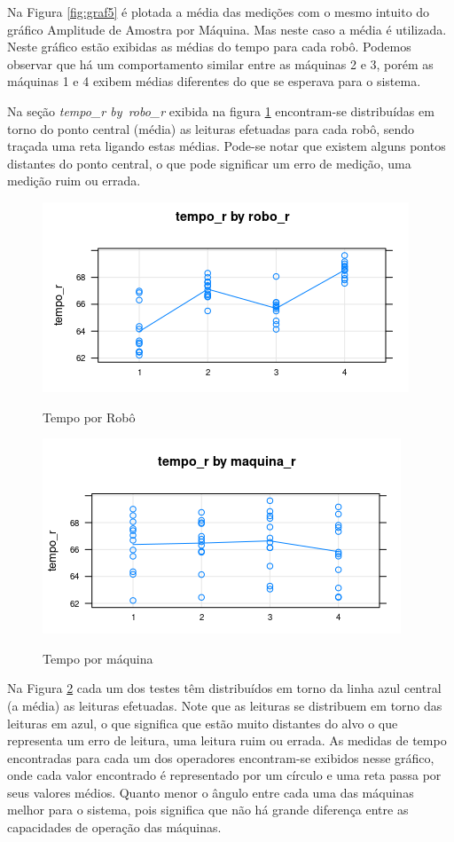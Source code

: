 \documentclass[
12pt,					%
openright,				%
oneside,				%
a4paper,				%
english,
brazil
]{ABNT/abntex2_report}
\begin{document}
Na Figura \ref{fig:graf5} é plotada a média das medições com o mesmo intuito do gráfico Amplitude de Amostra por Máquina. Mas neste caso a média é utilizada. Neste gráfico estão exibidas as médias do tempo para cada robô. Podemos observar que há um comportamento similar entre as máquinas 2 e 3, porém as máquinas 1 e 4 exibem médias diferentes do que se esperava para o
sistema.

Na seção \textit{tempo\_r by\ robo\_r} exibida na figura \ref{fig:tempo_robo} encontram-se distribuídas em torno do ponto central (média) as leituras efetuadas para cada robô, sendo traçada uma reta ligando estas médias. Pode-se notar que existem alguns pontos distantes do ponto central, o que pode significar um erro de medição, uma medição ruim ou errada.
\begin{figure}[H]
	\caption{Tempo por Robô}
	\includegraphics[]{figures/graf2.png}
	\label{fig:tempo_robo}
\end{figure}

\begin{figure}[H]
	\centering
	\caption{Tempo por máquina}
	\includegraphics[scale = 1]{figures/graf4.png}
	\label{fig:graf4}
\end{figure}

Na Figura \ref{fig:graf4} cada um dos testes têm distribuídos em torno da linha azul central (a média) as leituras efetuadas. Note que as leituras se distribuem em torno das leituras em azul, o que significa que estão muito distantes do alvo o que representa um erro de leitura, uma leitura ruim ou errada. As medidas de tempo encontradas para cada um dos operadores encontram-se exibidos nesse gráfico, onde cada valor encontrado é representado por um círculo e uma reta passa por seus valores médios. Quanto menor o ângulo entre cada uma das máquinas melhor para o sistema, pois significa que não há grande diferença entre as capacidades de operação das máquinas.
\end{document}
